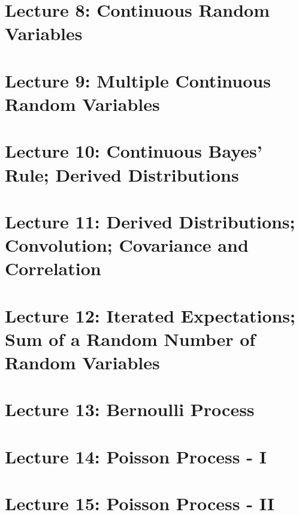 \documentclass{article}
\begin{document}
\section{Lecture 8: Continuous Random Variables}



\section{Lecture 9: Multiple Continuous Random Variables}



\section{Lecture 10: Continuous Bayes' Rule; Derived Distributions}



\section{Lecture 11: Derived Distributions; Convolution; Covariance and Correlation}



\section{Lecture 12: Iterated Expectations; Sum of a Random Number of Random Variables}



\section{Lecture 13: Bernoulli Process}



\section{Lecture 14: Poisson Process - I}



\section{Lecture 15: Poisson Process - II}


\end{document}
